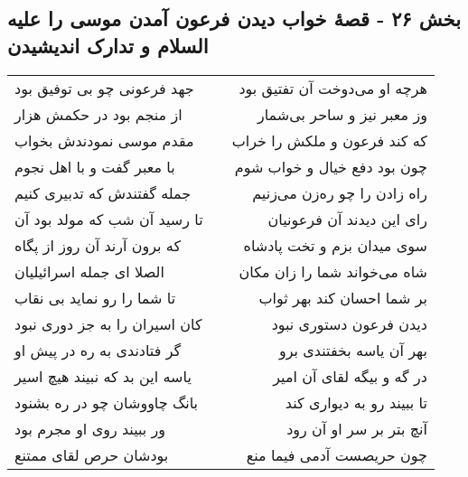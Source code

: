 \begin{center}
\section*{بخش ۲۶ - قصهٔ خواب دیدن فرعون آمدن موسی را  علیه السلام و تدارک اندیشیدن}
\label{sec:sh026}
\begin{longtable}{l p{0.5cm} r}
جهد فرعونی چو بی توفیق بود
&&
هرچه او می‌دوخت آن تفتیق بود
\\
از منجم بود در حکمش هزار
&&
وز معبر نیز و ساحر بی‌شمار
\\
مقدم موسی نمودندش بخواب
&&
که کند فرعون و ملکش را خراب
\\
با معبر گفت و با اهل نجوم
&&
چون بود دفع خیال و خواب شوم
\\
جمله گفتندش که تدبیری کنیم
&&
راه زادن را چو ره‌زن می‌زنیم
\\
تا رسید آن شب که مولد بود آن
&&
رای این دیدند آن فرعونیان
\\
که برون آرند آن روز از پگاه
&&
سوی میدان بزم و تخت پادشاه
\\
الصلا ای جمله اسرائیلیان
&&
شاه می‌خواند شما را زان مکان
\\
تا شما را رو نماید بی نقاب
&&
بر شما احسان کند بهر ثواب
\\
کان اسیران را به جز دوری نبود
&&
دیدن فرعون دستوری نبود
\\
گر فتادندی به ره در پیش او
&&
بهر آن یاسه بخفتندی برو
\\
یاسه این بد که نبیند هیچ اسیر
&&
در گه و بیگه لقای آن امیر
\\
بانگ چاووشان چو در ره بشنود
&&
تا ببیند رو به دیواری کند
\\
ور ببیند روی او مجرم بود
&&
آنچ بتر بر سر او آن رود
\\
بودشان حرص لقای ممتنع
&&
چون حریصست آدمی فیما منع
\\
\end{longtable}
\end{center}
